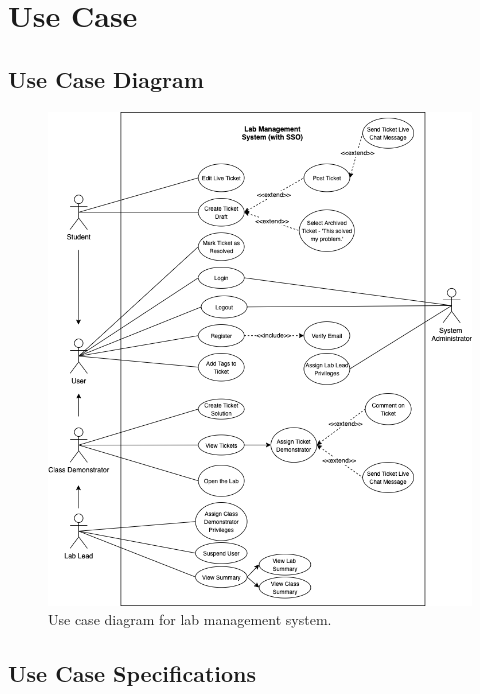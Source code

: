 \newpage
\section{Use Case}

\subsection{Use Case Diagram}

\begin{figure}[H]
    \centering
    \includegraphics[width=\textwidth]{5design/images/useCase.png}
    \caption{Use case diagram for lab management system.}
    \label{fig:useCase}
\end{figure}

\subsection{Use Case Specifications}

